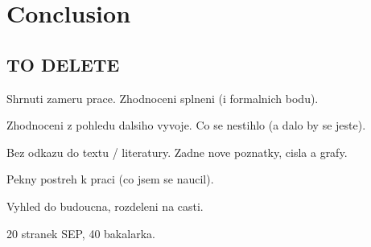 \chapter{Conclusion}

\section{TO DELETE}
Shrnuti zameru prace. Zhodnoceni splneni (i formalnich bodu).

Zhodnoceni z pohledu dalsiho vyvoje. Co se nestihlo (a dalo by se jeste).

Bez odkazu do textu / literatury. Zadne nove poznatky, cisla a grafy.

Pekny postreh k praci (co jsem se naucil).

Vyhled do budoucna, rozdeleni na casti.

20 stranek SEP, 40 bakalarka.




